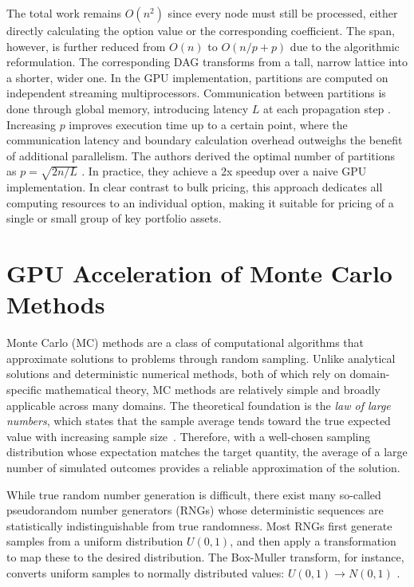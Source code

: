 \documentclass[english,12pt,a4paper,pdftex,sci,utf8]{aaltothesis}
\begin{document}
The total work remains $O(n^2)$ since every node must still be processed, either directly calculating the option value or the corresponding coefficient. The span, however, is further reduced from $O(n)$ to $O(n/p + p)$ due to the algorithmic reformulation. The corresponding DAG transforms from a tall, narrow lattice into a shorter, wider one. In the GPU implementation, partitions are computed on independent streaming multiprocessors. Communication between partitions is done through global memory, introducing latency $L$ at each propagation step \cite{ganesan2009acceleration}. Increasing $p$ improves execution time up to a certain point, where the communication latency and boundary calculation overhead outweighs the benefit of additional parallelism. The authors derived the optimal number of partitions as $p = \sqrt{2n/L}$ \cite{ganesan2009acceleration}. In practice, they achieve a 2x speedup over a naive GPU implementation. In clear contrast to bulk pricing, this approach dedicates all computing resources to an individual option, making it suitable for pricing of a single or small group of key portfolio assets.

\section{GPU Acceleration of Monte Carlo Methods} \label{sec:gpu-mc}
Monte Carlo (MC) methods are a class of computational algorithms that approximate solutions to problems through random sampling. Unlike analytical solutions and deterministic numerical methods, both of which rely on domain-specific mathematical theory, MC methods are relatively simple and broadly applicable across many domains. The theoretical foundation is the \emph{law of large numbers}, which states that the sample average tends toward the true expected value with increasing sample size~\cite{Ross2020prob}. Therefore, with a well-chosen sampling distribution whose expectation matches the target quantity, the average of a large number of simulated outcomes provides a reliable approximation of the solution.

While true random number generation is difficult, there exist many so-called pseudorandom number generators (RNGs) whose deterministic sequences are statistically indistinguishable from true randomness. Most RNGs first generate samples from a uniform distribution $U(0,1)$, and then apply a transformation to map these to the desired distribution. The Box-Muller transform, for instance, converts uniform samples to normally distributed values: $U(0,1) \rightarrow N(0,1)$ \cite{gentle2003random}.
\end{document}
